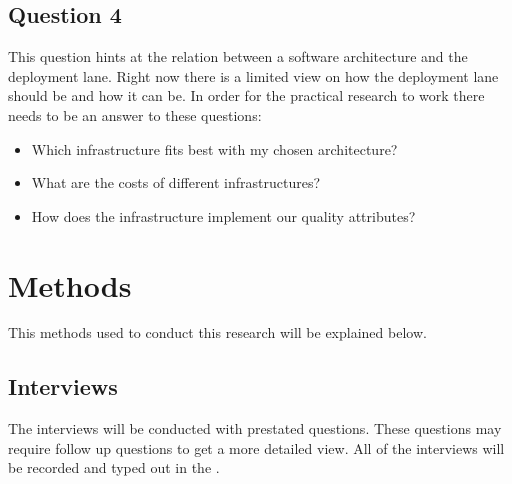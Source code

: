 \subsection{Question 4}


This question hints at the relation between a software architecture and the deployment lane. Right now there is a limited view on how the deployment lane should be and how it can be. In order for the practical research to work there needs to be an answer to these questions:
\begin{itemize}
	\item Which infrastructure fits best with my chosen architecture?
	\item What are the costs of different infrastructures?
	\item How does the infrastructure implement our quality attributes?
\end{itemize}

\section{Methods}

This methods used to conduct this research will be explained below.

\subsection{Interviews}
The interviews will be conducted with prestated questions. These questions may require follow up questions to get a more detailed view. All of the interviews will be recorded and typed out in the .
